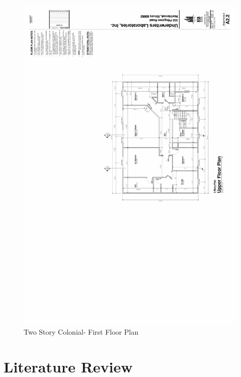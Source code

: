 \documentclass{article}
\begin{document}
\begin{appendices}
\begin{figure}[H]
	\includegraphics[width = 6.25in]{0_Images/Construction_Drawings/2_Story_Floor_Plan_Upper.pdf}
	\caption{Two Story Colonial- First Floor Plan}
\end{figure}

\clearpage

\section{Literature Review}


\end{appendices}
\end{document}
